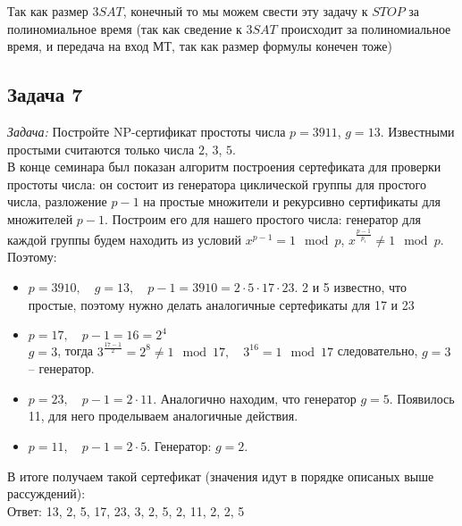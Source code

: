 \documentclass[a4paper,12pt]{article} %
\begin{document}
Так как размер $ 3SAT $, конечный то мы можем свести эту задачу к $ STOP $ за полиномиальное время (так как сведение к $ 3SAT $ происходит за полиномиальное время, и передача на вход МТ, так как размер формулы конечен тоже)\\


\subsection*{Задача 7}
\textit{Задача:} Постройте NP-сертификат простоты числа $p = 3911$, $g = 13$. Известными простыми считаются только числа $2$, $3$, $5$.\\

В конце семинара был показан алгоритм построения сертефиката для проверки простоты числа: он состоит из генератора циклической группы для простого числа, разложение $p-1$ на простые множители и рекурсивно сертификаты для множителей $p-1$. Построим его для нашего простого числа: генератор для каждой группы будем находить из условий $x^{p-1} = 1 \mod p$, $x^{\frac{p-1}{p_i}} \neq 1 \mod p$. Поэтому:\\
\begin{itemize}
\item $ p = 3910, \quad g = 13, \quad p - 1 = 3910 = 2 \cdot5 \cdot 17 \cdot 23  $. 2 и 5 известно, что простые, поэтому нужно делать аналогичные сертефикаты для 17 и 23
\item $ p = 17, \quad p - 1 = 16 = 2^4  $\\
$ g = 3 $, тогда $ 3^{\frac{17-1}{2}} = 2^8 \neq 1 \mod 17, \quad 3^{16} = 1 \mod 17 $ следовательно, $ g = 3 $ -- генератор.
\item $ p =  23, \quad p-1 = 2 \cdot 11$. Аналогично находим, что генератор $ g = 5 $. Появилось 11, для него проделываем аналогичные действия.
\item $ p = 11, \quad p-1 = 2 \cdot 5 $. Генератор: $ g = 2 $.
\end{itemize}
В итоге получаем такой сертефикат (значения идут в порядке описаных выше рассуждений):\\

Ответ: 13, 2, 5, 17, 23, 3, 2, 5, 2, 11, 2, 2, 5
\end{document}
